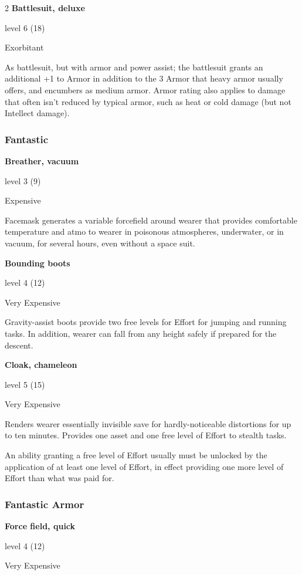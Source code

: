 \begin{multicols}{2}
\textbf{Battlesuit, deluxe} 

level 6 (18) 

Exorbitant 

As battlesuit, but with armor and power assist; the battlesuit grants an additional +1 to Armor in addition to the 3 Armor that heavy armor usually offers, and encumbers as medium armor. Armor rating also applies to damage that often isn’t reduced by typical armor, such as heat or cold damage (but not Intellect damage).

\subsubsection{Fantastic}

\textbf{Breather, vacuum} 

level 3 (9) 

Expensive 

Facemask generates a variable forcefield around wearer that provides comfortable temperature and atmo to wearer in poisonous atmospheres, underwater, or in vacuum, for several hours, even without a space suit. 

\textbf{Bounding boots}

level 4 (12) 

Very Expensive 

Gravity-assist boots provide two free levels for Effort for jumping and running tasks. In addition, wearer can fall from any height safely if prepared for the descent. 

\textbf{Cloak, chameleon}

level 5 (15) 

Very Expensive 

Renders wearer essentially invisible save for hardly-noticeable distortions for up to ten minutes. Provides one asset and one free level of Effort to stealth tasks.

An ability granting a free level of Effort usually must be unlocked by the application of at least one level of Effort, in effect providing one more level of Effort than what was paid for.

\subsubsection{Fantastic Armor}

\textbf{Force field, quick}

level 4 (12)

Very Expensive 


\end{multicols}
